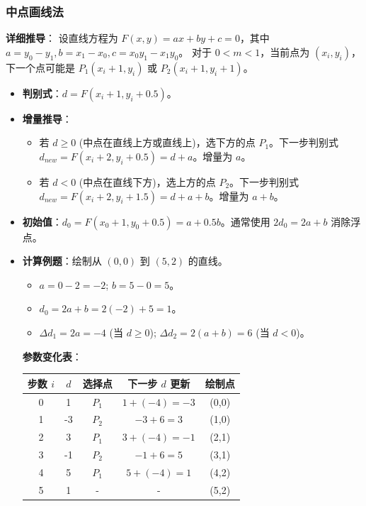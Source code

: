 \documentclass[UTF8]{ctexart}
\begin{document}
\subsubsection{中点画线法}
\textbf{详细推导}：
设直线方程为 $F(x,y) = ax + by + c = 0$，其中 $a = y_0 - y_1, b = x_1 - x_0, c = x_0 y_1 - x_1 y_0$。
对于 $0 < m < 1$，当前点为 $(x_i, y_i)$，下一个点可能是 $P_1(x_i+1, y_i)$ 或 $P_2(x_i+1, y_i+1)$。
\begin{itemize}
    \item \textbf{判别式}：$d = F(x_i+1, y_i+0.5)$。
    \item \textbf{增量推导}：
        \begin{itemize}
            \item 若 $d \ge 0$ (中点在直线上方或直线上)，选下方的点 $P_1$。下一步判别式 $d_{new} = F(x_i+2, y_i+0.5) = d + a$。增量为 $a$。
            \item 若 $d < 0$ (中点在直线下方)，选上方的点 $P_2$。下一步判别式 $d_{new} = F(x_i+2, y_i+1.5) = d + a + b$。增量为 $a + b$。
        \end{itemize}
    \item \textbf{初始值}：$d_0 = F(x_0+1, y_0+0.5) = a + 0.5b$。通常使用 $2d_0 = 2a + b$ 消除浮点。
    \item \textbf{计算例题}：绘制从 $(0,0)$ 到 $(5,2)$ 的直线。
        \begin{itemize}
            \item $a = 0-2 = -2$; $b = 5-0 = 5$。
            \item $d_0 = 2a + b = 2(-2) + 5 = 1$。
            \item $\Delta d_1 = 2a = -4$ (当 $d \ge 0$); $\Delta d_2 = 2(a+b) = 6$ (当 $d < 0$)。
        \end{itemize}
        \textbf{参数变化表}：
        \begin{center}
        \begin{tabular}{|c|c|c|c|c|}
            \hline
            步数 $i$ & $d$ & 选择点 & 下一步 $d$ 更新 & 绘制点 \\
            \hline
            0 & 1 & $P_1$ & $1+(-4)=-3$ & (0,0) \\
            1 & -3 & $P_2$ & $-3+6=3$ & (1,0) \\
            2 & 3 & $P_1$ & $3+(-4)=-1$ & (2,1) \\
            3 & -1 & $P_2$ & $-1+6=5$ & (3,1) \\
            4 & 5 & $P_1$ & $5+(-4)=1$ & (4,2) \\
            5 & 1 & - & - & (5,2) \\

\end{tabular}
\end{center}
\end{itemize}
\end{document}
